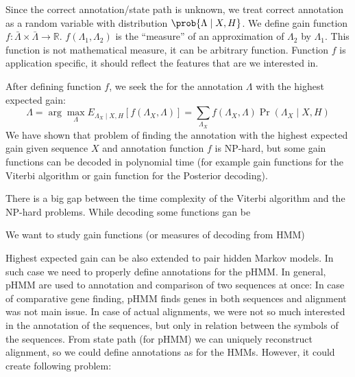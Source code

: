 Since the correct annotation/state path is unknown, we treat correct annotation
as a random variable with distribution $\prob{\Lambda\mid X,H}$. We define gain
function $f:\bar{\Lambda}\times\bar{\Lambda}\to \mathbb{R}$.
$f(\Lambda_1,\Lambda_2)$ is the ``measure'' of an approximation of $\Lambda_2$
by $\Lambda_1$. This function is not mathematical measure, it can be arbitrary
function. Function $f$ is application specific, it should reflect the features
that are we interested in.

After defining function $f$, we seek the for the annotation $\Lambda$ with the highest expected gain:
\[\Lambda = \arg\max_{\Lambda} 
E_{\Lambda_X\mid X,H}[f(\Lambda_X,\Lambda)] =
\sum_{\Lambda_X}f(\Lambda_X,\Lambda)\Pr\left(\Lambda_X\mid X,H\right)
\]
We have shown that problem of finding the annotation with the highest expected
gain given sequence $X$ and annotation function $f$ is NP-hard, but some gain
functions can be decoded in polynomial time (for example gain functions for the
Viterbi algorithm or gain function for  the Posterior decoding).

There is a big gap between the time complexity of the Viterbi algorithm and the
NP-hard problems. While decoding some functions gan be 

We want to study gain functions (or measures of decoding from HMM) 

Highest expected gain can be also extended to pair hidden Markov models. In such
case we need to properly define annotations for the pHMM. In general, pHMM are
used to annotation and comparison of two sequences at once: In case of
comparative gene finding, pHMM finds genes in both sequences and alignment was
not main issue. In case of actual alignments, we were not so much interested in
the annotation of the sequences, but only in relation between the symbols of the
sequences. From state path (for pHMM) we can uniquely reconstruct alignment, so
we could define annotations as for the HMMs. However, it could create following
problem:

